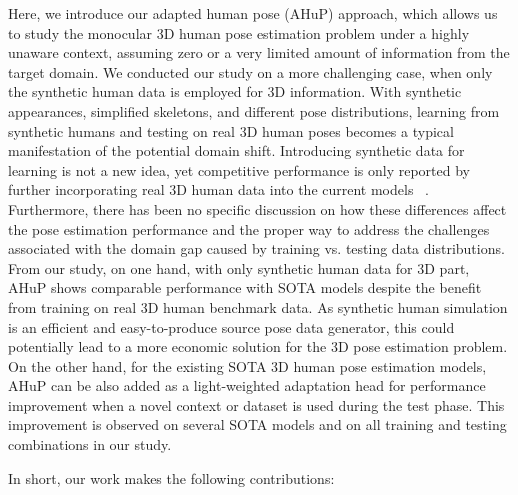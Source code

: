 \documentclass[twocolumn]{svjour3}          \smartqed  \usepackage{graphicx}
\begin{document}
Here, we introduce our adapted human pose (AHuP) approach, which allows us to study the monocular 3D human pose estimation problem under a highly unaware context, assuming zero  or a very  limited amount of information from the target domain. 
We conducted our study on a more challenging case, when only the  synthetic human data is employed for 3D information. With synthetic appearances, simplified skeletons, and different pose distributions, learning from synthetic humans and testing on real 3D human poses becomes a typical manifestation of the potential domain shift. 
Introducing synthetic data for learning is not a new idea,  yet competitive performance is only reported by further incorporating  real 3D human data into the current models \mbox{ \cite{varol17_surreal}}. Furthermore, there has been no specific discussion on how these differences affect the pose estimation performance and the proper way to address the challenges associated with the domain gap caused by training vs. testing data distributions. 
From our study, on one hand, with only synthetic human data for 3D part, AHuP shows comparable performance with SOTA models despite the benefit from training on real 3D human benchmark data.  
As synthetic human simulation is an efficient and easy-to-produce source pose data generator, this could potentially lead to a more economic solution for the 3D pose estimation problem. 
On the other hand, for the existing SOTA 3D human pose estimation  models, AHuP can be also added as a light-weighted adaptation head for performance improvement when a novel context or dataset is used during the test phase. This improvement is observed on several SOTA models and on all training and testing combinations in our study. 



In short, our work makes the following contributions: 
\end{document}
